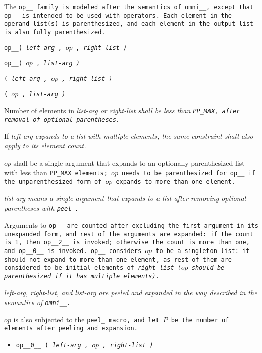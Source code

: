 The \tt{op__} family is modeled after the semantics of \tt{omni__},
except that \tt{op__} is intended to be used with operators.
Each element in the operand list(s) is parenthesized,
and each element in the output list is also fully parenthesized.


 \tt{op__}\s\s\s\s\tt{(} \it{left-arg} \tt{,} $op$ \tt{,} \it{right-list} \tt{)}

 \tt{op__}\s\s\s\s\tt{(} $op$ \tt{,} \it{list-arg} \tt{)}

\s\tt{(} \it{left-arg} \tt{,} $op$ \tt{,} \it{right-list} \tt{)}

\s\tt{(} $op$ \tt{,} \it{list-arg} \tt{)}


Number of elements in \it{list-arg} or \it{right-list} shall be
less than \tt{PP_MAX}, after removal of optional parentheses.

If \it{left-arg} expands to a list with multiple elements,
the same constraint shall also apply to its element count.

$op$ shall be a single argument that expands to an optionally parenthesized
list with less than \tt{PP_MAX} elements; $op$ needs to be parenthesized for
\tt{op__} if the unparenthesized form of $op$ expands to more than one element.

\note \it{list-arg} means a single argument that expands to
a list after removing optional parentheses with \tt{peel_}.


Arguments to \tt{op__} are counted after excluding the first
argument in its unexpanded form, and rest of the arguments
are expanded: if the count is 1, then \tt{op__2__} is invoked;
otherwise the count is more than one, and  \tt{op__0__} is invoked.
\tt{op__} considers $op$ to be a singleton list: it should not expand to
more than one element, as rest of them are considered to be initial elements
of \it{right-list} ($op$ should be parenthesized if it has multiple elements).

\it{left-arg}, \it{right-list}, and \it{list-arg} are peeled and
expanded in the way described in the semantics of \tt{omni__}.

$op$ is also subjected to the \tt{peel_} macro, and let
$P$ be the number of elements after peeling and expansion.

\begin{itemize}
\item \tt{op__0__ (} \it{left-arg} \tt{,} $op$ \tt{,} \it{right-list} \tt{)}
\end{itemize}

